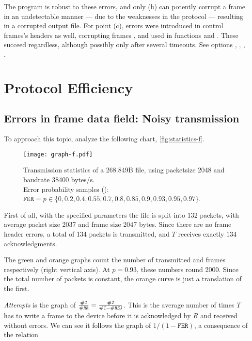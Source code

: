 \documentclass[main.tex]{subfiles}
\begin{document}
The program is robust to these errors, and only (b) can potently corrupt a frame in an undetectable manner --- due to the weaknesses in the protocol --- resulting in a corrupted output file. For point (c), errors were introduced in control frames's headers as well, corrupting frames \fSET{}, \fDISC{} and \fUA{} used in functions  and . These succeed regardless, although possibly only after several timeouts. See options , , , .

\section{Protocol Efficiency}
\label{sec:pefficiency}

\subsection{Errors in frame data field: Noisy transmission}
\label{subsec:noisy}

To approach this topic, analyze the following chart, \autoref{fig:statistics-f}.

\begin{figure}[htbp]
\texttt{[image: graph-f.pdf]}
\caption{Transmission statistics of a 268.849B file, using packetsize 2048 and baudrate 38400 bytes/s.\\ Error probability samples (): $\texttt{FER}=p\in\{0,0.2,0.4,0.55,0.7,0.8,0.85,0.9,0.93,0.95,0.97\}$.}
\label{fig:statistics-f}
\end{figure}

First of all, with the specified parameters the file is split into 132 packets, with average packet size 2037 and \fI{} frame size 2047 bytes. Since there are no frame header errors, a total of 134 packets is transmitted, and $T$ receives exactly $134$ \fRR{} acknowledgments.

The green and orange graphs count the number of transmitted \fI{} and \fREJ{} frames respectively (right vertical axis). At $p=0.93$, these numbers round 2000. Since the total number of packets is constant, the orange curve is just a translation of the first.

\emph{Attempts} is the graph of $\tfrac{\#\fI}{\#\fRR}=\tfrac{\#\fI}{\#\fI-\#\fREJ}$. This is the average number of times $T$ has to write a frame \fI{} to the device before it is acknowledged by $R$ and received without errors. We can see it follows the graph of $1/(1-\texttt{FER})$, a consequence of the relation
\end{document}

